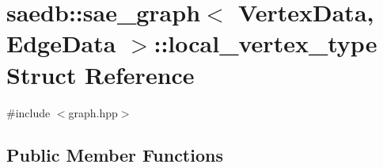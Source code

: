 \hypertarget{structsaedb_1_1sae__graph_1_1local__vertex__type}{\section{saedb\-:\-:sae\-\_\-graph$<$ Vertex\-Data, Edge\-Data $>$\-:\-:local\-\_\-vertex\-\_\-type Struct Reference}
\label{d7/d91/structsaedb_1_1sae__graph_1_1local__vertex__type}
}


{\ttfamily \#include $<$graph.\-hpp$>$}

\subsection*{Public Member Functions}
